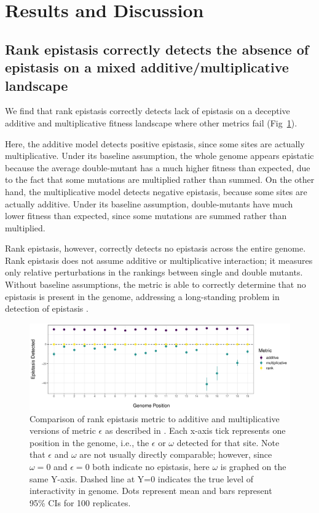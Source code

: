 \section{Results and Discussion}


\subsection{Rank epistasis correctly detects the absence of epistasis on a mixed additive/multiplicative landscape}

We find that rank epistasis correctly detects lack of epistasis on a deceptive additive and multiplicative fitness landscape where other metrics fail (Fig~\ref{fig:res:addmult}). 

Here, the additive model detects positive epistasis, since some sites are actually multiplicative. Under its baseline assumption, the whole genome appears epistatic because the average double-mutant has a much higher fitness than expected, due to the fact that some mutations are multiplied rather than summed. On the other hand, the multiplicative model detects negative epistasis, because some sites are actually additive. Under its baseline assumption, double-mutants have much lower fitness than expected, since some mutations are summed rather than multiplied.

Rank epistasis, however, correctly detects no epistasis across the entire genome. Rank epistasis does not assume additive or multiplicative interaction; it measures only relative perturbations in the rankings between single and double mutants. Without baseline assumptions, the metric is able to correctly determine that no epistasis is present in the genome, addressing a long-standing problem in detection of epistasis \citep{cordell_epistasis_2002, puniyani_meaning_2004}. 

\begin{figure}
    \centering
    \includegraphics[width=\textwidth]{chapters/1-rank-epistasis/figs/summary_addmult.pdf}
    \caption{Comparison of rank epistasis metric to additive and multiplicative versions of metric $\epsilon$ as described in \cite{ostman_impact_2011}. Each x-axis tick represents one position in the genome, i.e., the $\epsilon$ or $\omega$ detected for that site. Note that $\epsilon$ and $\omega$ are not usually directly comparable; however, since $\omega=0$ and $\epsilon=0$ both indicate no epistasis, here $\omega$ is graphed on the same Y-axis. Dashed line at Y=0 indicates the true level of interactivity in genome. Dots represent mean and bars represent 95\% CIs for 100 replicates.}
    \label{fig:res:addmult}
\end{figure}

